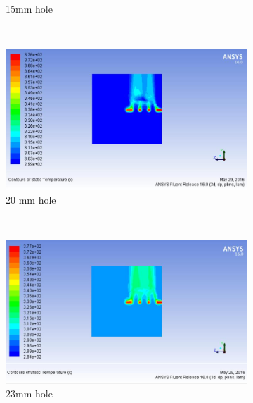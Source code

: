 \begin{figure}[h]
\begin{subfigure}[b]{0.5\textwidth}
 		\caption{15mm hole}
 		\label{fig:structured}
 	\end{subfigure}%
 	~ %
 	\begin{subfigure}[b]{0.5\textwidth}
 		\includegraphics[width=\textwidth]{123.jpg}
 		\caption{20 mm hole}
 		\label{fig:unstructured}
 	\end{subfigure}
 	~ %
 	\begin{subfigure}[b]{0.5\textwidth}
 		\includegraphics[width=\textwidth]{124.jpg}
 		\caption{23mm hole}
 		\label{fig:structured}
 	\end{subfigure}%
 	~ %
 	\begin{subfigure}[b]{0.5\textwidth}

\end{subfigure}
\end{figure}

